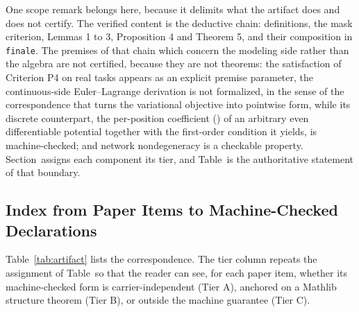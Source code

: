 One scope remark belongs here, because it delimits what the artifact does and does not certify. The verified content is the deductive chain: definitions, the mask criterion, Lemmas 1 to 3, Proposition 4 and Theorem 5, and their composition in \texttt{finale}. The premises of that chain which concern the modeling side rather than the algebra are not certified, because they are not theorems: the satisfaction of Criterion P4 on real tasks appears as an explicit premise parameter, the continuous-side Euler--Lagrange derivation is not formalized, in the sense of the correspondence that turns the variational objective into pointwise form, while its discrete counterpart, the per-position coefficient (\pEqFoc) of an arbitrary even differentiable potential together with the first-order condition it yields, is machine-checked; and network nondegeneracy is a checkable property. Section~\pSecLayers assigns each component its tier, and Table~\pTabLayers is the authoritative statement of that boundary.

\subsection{Index from Paper Items to Machine-Checked Declarations}

Table~\ref{tab:artifact} lists the correspondence. The tier column repeats the assignment of Table~\pTabLayers so that the reader can see, for each paper item, whether its machine-checked form is carrier-independent (Tier A), anchored on a Mathlib structure theorem (Tier B), or outside the machine guarantee (Tier C).

